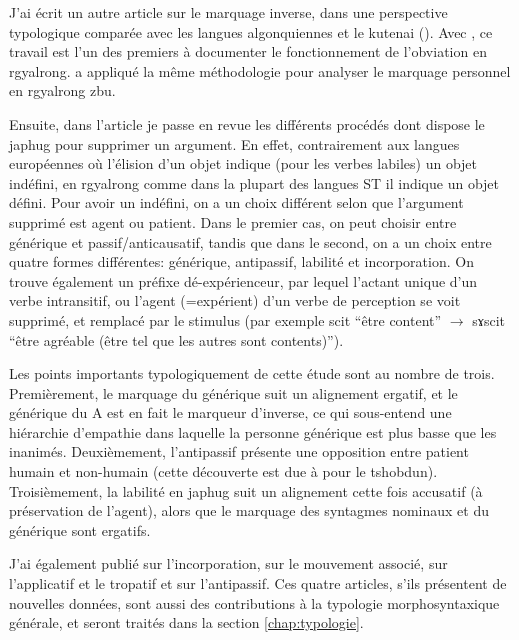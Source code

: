 \documentclass[oldfontcommands,oneside,a4paper,11pt]{memoir}
\newcommand{\ipa}[1]{{\phon #1}} %
\begin{document}
	J'ai écrit un autre article sur le marquage inverse, dans une perspective typologique comparée avec les langues algonquiennes et le kutenai (\citealt{jacques10inverse}). Avec \citet{jackson02rentongdengdi}, ce travail est l'un des premiers à documenter le fonctionnement de l'obviation en rgyalrong.   \citet{gongxun14agreement} a appliqué la même méthodologie pour analyser le marquage personnel en rgyalrong zbu. 
	
Ensuite, dans l'article \citet{jacques12demotion}   je passe en revue les différents procédés dont dispose le japhug pour supprimer un argument. En effet, contrairement aux langues européennes où l'élision d'un objet indique (pour les verbes labiles) un objet indéfini, en rgyalrong comme dans la plupart des langues ST il indique un objet défini. Pour avoir un indéfini, on a un choix différent selon que l'argument supprimé est agent ou patient. Dans le premier cas, on peut choisir entre générique et passif/anticausatif, tandis que dans le second, on a un choix entre quatre formes différentes: générique, antipassif, labilité et incorporation. On trouve également un préfixe dé-expérienceur, par lequel l'actant unique d'un verbe intransitif, ou l'agent (=expérient) d'un verbe de perception se voit supprimé, et remplacé par le stimulus (par exemple \ipa{scit} ``être content'' $\rightarrow $ \ipa{sɤscit} ``être agréable (être tel que les autres sont contents)'').
	
	Les points importants typologiquement de cette étude sont au nombre de trois. Premièrement, le marquage du générique suit un alignement ergatif, et le générique du A est en fait le marqueur d'inverse, ce qui sous-entend une hiérarchie d'empathie dans laquelle la personne générique est plus basse que les inanimés. Deuxièmement, l'antipassif présente une opposition entre patient humain et non-humain (cette découverte est due à \citet{jackson06paisheng} pour le tshobdun). Troisièmement, la labilité en japhug suit un alignement cette fois accusatif (à préservation de l'agent), alors que le marquage des syntagmes nominaux et du générique sont ergatifs. 
	
	J'ai également publié \citet{jacques12incorp} sur l'incorporation,  \citet{jacques13harmonization} sur le mouvement associé, \citet{jacques13tropative} sur l'applicatif et le tropatif et \citet{jacques14antipassive} sur l'antipassif. Ces quatre articles, s'ils présentent de nouvelles données, sont aussi des contributions à la typologie morphosyntaxique générale, et seront traités dans la section \ref{chap:typologie}. 
	
\end{document}
